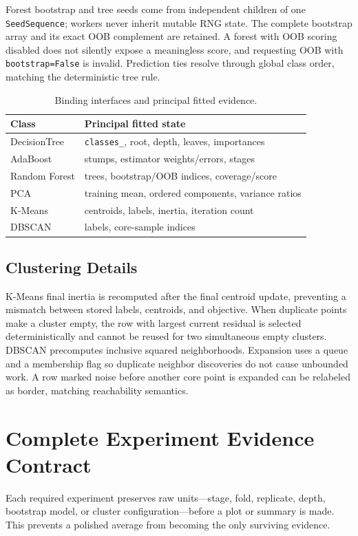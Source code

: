 \documentclass[conference]{IEEEtran}
\begin{document}
Forest bootstrap and tree seeds come from independent children of one
\texttt{SeedSequence}; workers never inherit mutable RNG state. The complete
bootstrap array and its exact OOB complement are retained. A forest with OOB
scoring disabled does not silently expose a meaningless score, and requesting
OOB with \texttt{bootstrap=False} is invalid. Prediction ties resolve through
global class order, matching the deterministic tree rule.

\begin{table}[t]
\caption{Binding interfaces and principal fitted evidence.}
\centering
\begin{tabular}{lp{4.7cm}}
\toprule
Class & Principal fitted state \\
\midrule
DecisionTree & \texttt{classes\_}, root, depth, leaves, importances \\
AdaBoost & stumps, estimator weights/errors, stages \\
Random Forest & trees, bootstrap/OOB indices, coverage/score \\
PCA & training mean, ordered components, variance ratios \\
K-Means & centroids, labels, inertia, iteration count \\
DBSCAN & labels, core-sample indices \\
\bottomrule
\end{tabular}
\end{table}

\subsection{Clustering Details}
K-Means final inertia is recomputed after the final centroid update, preventing
a mismatch between stored labels, centroids, and objective. When duplicate
points make a cluster empty, the row with largest current residual is selected
deterministically and cannot be reused for two simultaneous empty clusters.
DBSCAN precomputes inclusive squared neighborhoods. Expansion uses a queue and
a membership flag so duplicate neighbor discoveries do not cause unbounded
work. A row marked noise before another core point is expanded can be relabeled
as border, matching reachability semantics.

\section{Complete Experiment Evidence Contract}
Each required experiment preserves raw units---stage, fold, replicate,
depth, bootstrap model, or cluster configuration---before a plot or summary is
made. This prevents a polished average from becoming the only surviving
evidence.
\end{document}
